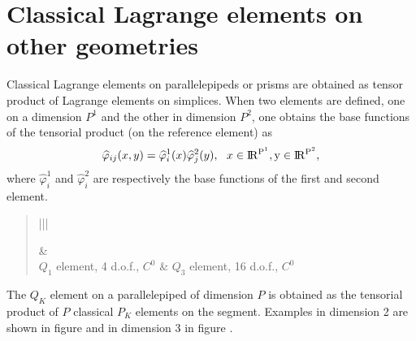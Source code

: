 \documentclass[a4paper,11pt,english]{sphinxmanual}
\begin{document}
\section{Classical Lagrange elements on other geometries}
\label{\detokenize{userdoc/appendixA:classical-lagrange-elements-on-other-geometries}}
Classical Lagrange elements on parallelepipeds or prisms are obtained as tensor
product of Lagrange elements on simplices. When two elements are defined, one on a
dimension \(P^1\) and the other in dimension \(P^2\), one obtains the base
functions of the tensorial product (on the reference element) as
\begin{equation*}
\begin{split}\widehat{\varphi}_{ij}(x,y) = \widehat{\varphi}^1_i(x) \widehat{\varphi}^2_j(y), ~~ x \in \rm I\hspace{-0.15em}R^{P^1}, y \in  \rm I\hspace{-0.15em}R^{P^2},\end{split}
\end{equation*}
where \(\widehat{\varphi}^1_i\) and \(\widehat{\varphi}^2_i\) are respectively the base functions
of the first and second element.
\begin{quote}


\begin{savenotes}\sphinxattablestart
\centering
{}
\sphinxthecaptionisattop
{}\label{\detokenize{userdoc/appendixA:id15}}\label{\detokenize{userdoc/appendixA:ud-fig-prodpkdeux}}
\sphinxaftertopcaption
\begin{tabular}[t]{|||}
\hline

&
\\
\hline
\(Q_1\) element, 4 d.o.f., \(C^0\)
&
\(Q_3\) element, 16 d.o.f., \(C^0\)
\\
\hline
\end{tabular}
\par
\sphinxattableend\end{savenotes}
\end{quote}

The \(Q_K\) element on a parallelepiped of dimension \(P\) is obtained as
the tensorial product of \(P\) classical \(P_K\) elements on the segment.
Examples in dimension 2 are shown in figure {\hyperref[\detokenize{userdoc/appendixA:ud-fig-prodpkdeux}]{}}
and in dimension 3 in figure {\hyperref[\detokenize{userdoc/appendixA:ud-fig-prodpktrois}]{}}.
\end{document}
